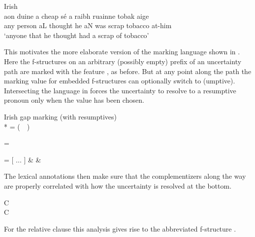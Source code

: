 \documentclass[output=paper,hidelinks]{langscibook}
\begin{document}
\ea\label{irishscrap}Irish\\
\gll aon duine a cheap sé a raibh ruainne tobak aige\\
    any person aL thought he aN was scrap tobacco at-him\\
\glt `anyone that he thought had a scrap of tobacco' %
\z

\noindent  This motivates the more elaborate version of the marking language shown in .  Here the f-structures on an arbitrary (possibly empty) prefix of an uncertainty path are marked with the feature , as before. But at any point along the path the marking value for embedded f-structures can optionally switch to (umptive).  Intersecting the language  in  forces the uncertainty to resolve to a resumptive pronoun only when the  value has been chosen. 

 \ea\label{Irishmark} Irish gap marking (with resumptives)\\*
\ea\label{mark2}
 =  \hsp{.5em}(\ \ )

\ex\label{Resolve} 
 =  \kstar {}

\ex\label{markpaths} = [ ... ] \&    \& 
\z\z

\noindent The lexical annotations  then make sure that the complementizers along the way are properly correlated with how the uncertainty is resolved at the bottom. 

\ea\label{Irishlex2} 
   C{}\\
  C{}
\z

\noindent  For the relative clause  this analysis gives rise to the abbreviated f-structure .
\end{document}
